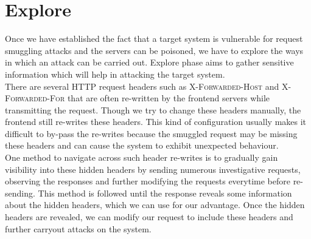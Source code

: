 \section{Explore}
Once we have established the fact that a target system is vulnerable for request smuggling attacks and the servers can be poisoned, we have to explore the ways in which an attack can be carried out. Explore phase aims to gather sensitive information which will help in attacking the target system. \\
There are several HTTP request headers such as \textsc{X-Forwarded-Host} and \textsc{X-Forwarded-For} that are often re-written by the frontend servers while transmitting the request. Though we try to change these headers manually, the frontend still re-writes these headers. This kind of configuration usually makes it difficult to by-pass the re-writes because the smuggled request may be missing these headers and can cause the system to exhibit unexpected behaviour. \\
One method to navigate across such header re-writes is to gradually gain visibility into these hidden headers by sending numerous investigative requests, observing the responses and further modifying the requests everytime before re-sending. This method is followed until the response reveals some information about the hidden headers, which we can use for our advantage. Once the hidden headers are revealed, we can modify our request to include these headers and further carryout attacks on the system. 
